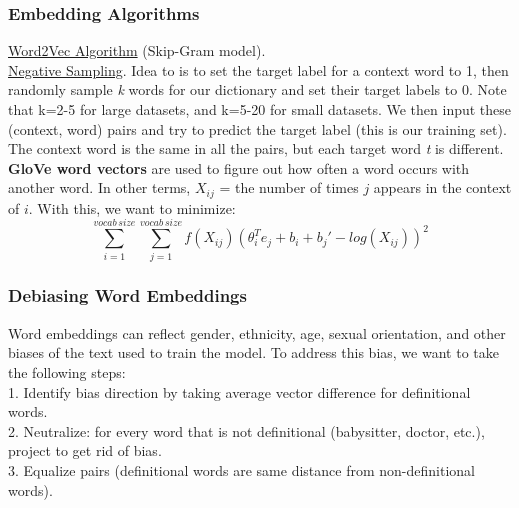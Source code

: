 \documentclass[11pt, a4paper]{article}
\begin{document}
\begin{spacing}{1.1}
	\subsubsection{Embedding Algorithms}
	\href{https://www.tensorflow.org/tutorials/text/word2vec}{Word2Vec Algorithm} (Skip-Gram model). \vspace*{1mm}\\
	\href{https://www.tensorflow.org/tutorials/text/word2vec#negative_sampling_for_one_skip-gram}{Negative Sampling}. Idea to is to set the target label for a context word to 1, then randomly sample \textit{k} words for our dictionary and set their target labels to 0. Note that k=2-5 for large datasets, and k=5-20 for small datasets. We then input these (context, word) pairs and try to predict the target label (this is our training set). The context word is the same in all the pairs, but each target word \textit{t} is different. \vspace*{1mm}\\ 
	\textbf{GloVe word vectors} are used to figure out how often a word occurs with another word. In other terms, $X_{ij}$ = the number of times $j$ appears in the context of $i$. With this, we want to minimize:
	$$ \sum_{i=1}^{vocab\,size} \sum_{j=1}^{vocab\,size} f(X_{ij})(\theta_i^T e_j + b_i +b_j' - log(X_{ij}))^2 $$
	
	\subsubsection{Debiasing Word Embeddings}
	Word embeddings can reflect gender, ethnicity, age, sexual orientation, and other biases of the text used to train the model. To address this bias, we want to take the following steps: \vspace*{.7mm}\\
	1. Identify bias direction by taking average vector difference for definitional words. \\
	2. Neutralize: for every word that is not definitional (babysitter, doctor, etc.), project to get rid of bias. \\
	3. Equalize pairs (definitional words are same distance from non-definitional words). \newpage


\end{spacing}
\end{document}
